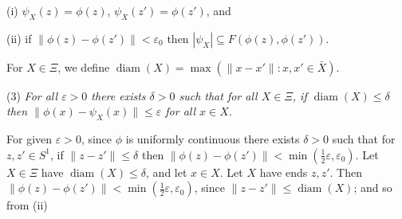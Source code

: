 \hspace*{12pt}(i) $\psi_X(z) = \phi(z)$, $\psi_X(z') = \phi(z')$, and

\hspace*{12pt}(ii) if $\|\phi(z) - \phi(z')\| < \varepsilon_0$ then $|\psi_X| \subseteq F(\phi(z), \phi(z'))$.

For $X \in \Xi$, we define $\operatorname{diam}(X) = \max(\|x - x'\| \colon x, x' \in \bar{X})$.

\hspace*{12pt}(3) \textit{For all $\varepsilon > 0$ there exists $\delta > 0$ such that for all $X \in \Xi$, if $\operatorname{diam}(X) \le \delta$ then $\|\phi(x) - \psi_X(x)\| \le \varepsilon$ for all $x \in X$.}

For given $\varepsilon > 0$, since $\phi$ is uniformly continuous there exists $\delta > 0$ such that for $z, z' \in S^1$, if $\|z - z'\| \le \delta$ then $\|\phi(z) - \phi(z')\| < \min(\frac{1}{2}\varepsilon, \varepsilon_0)$. Let $X \in \Xi$ have $\operatorname{diam}(X) \le \delta$, and let $x \in X$. Let $X$ have ends $z, z'$. Then $\|\phi(z) - \phi(z')\| < \min(\frac{1}{2}\varepsilon, \varepsilon_0)$, since $\|z - z'\| \le \operatorname{diam}(X)$; and so from (ii)
